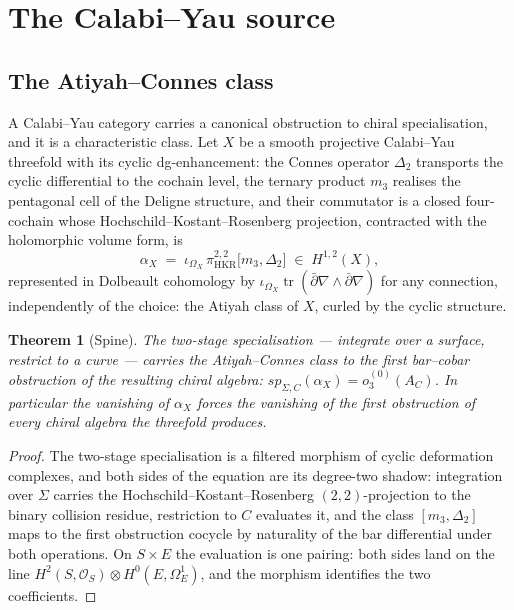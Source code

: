 \documentclass[11pt]{amsart}
\numberwithin{equation}{section}
\theoremstyle{plain}
\newtheorem{theorem}{Theorem}[section]
\theoremstyle{definition}
\theoremstyle{remark}
\begin{document}
\section{The Calabi--Yau source}\label{sec:CY}

\subsection{The Atiyah--Connes class}

A Calabi--Yau category carries a canonical obstruction to chiral
specialisation, and it is a characteristic class. Let $X$ be a smooth
projective Calabi--Yau threefold with its cyclic dg-enhancement: the
Connes operator $\Delta_2$ transports the cyclic differential to the
cochain level, the ternary product $m_3$ realises the pentagonal cell
of the Deligne structure, and their commutator is a closed
four-cochain whose Hochschild--Kostant--Rosenberg projection,
contracted with the holomorphic volume form, is
\begin{equation}
\alpha_X\;=\;\iota_{\Omega_X}\,\pi^{2,2}_{\mathrm{HKR}}
\bigl[m_3,\Delta_2\bigr]\;\in\;H^{1,2}(X),
\end{equation}
represented in Dolbeault cohomology by
$\iota_{\Omega_X}\operatorname{tr}(\bar\partial\nabla\wedge
\bar\partial\nabla)$ for any connection, independently of the
choice: the Atiyah class of $X$, curled by the cyclic structure.

\begin{theorem}[Spine]\label{thm:spine}
The two-stage specialisation --- integrate over a surface, restrict
to a curve --- carries the Atiyah--Connes class to the first
bar--cobar obstruction of the resulting chiral algebra:
$sp_{\Sigma,C}(\alpha_X)=o^{(0)}_3(A_C)$. In particular the vanishing
of $\alpha_X$ forces the vanishing of the first obstruction of every
chiral algebra the threefold produces.
\end{theorem}

\begin{proof}
The two-stage specialisation is a filtered morphism of cyclic
deformation complexes, and both sides of the equation are its
degree-two shadow: integration over $\Sigma$ carries the
Hochschild--Kostant--Rosenberg $(2,2)$-projection to the binary
collision residue, restriction to $C$ evaluates it, and the class
$[m_3,\Delta_2]$ maps to the first obstruction cocycle by naturality
of the bar differential under both operations. On $S\times E$ the
evaluation is one pairing: both sides land on the line
$H^{2}(S,\mathcal{O}_S)\otimes H^{0}(E,\Omega^{1}_E)$, and the
morphism identifies the two coefficients.
\end{proof}
\end{document}
